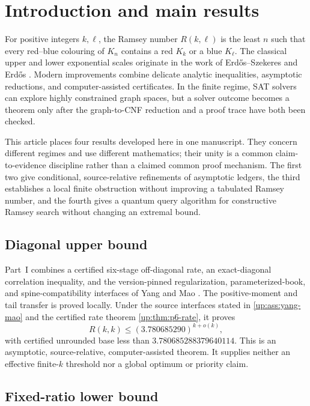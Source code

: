 \section{Introduction and main results}\label{sec:unified-introduction}

For positive integers $k,\ell$, the Ramsey number $R(k,\ell)$ is the
least $n$ such that every red--blue colouring of $K_n$ contains a red
$K_k$ or a blue $K_\ell$.  The classical upper and lower exponential
scales originate in the work of Erd\H{o}s--Szekeres and Erd\H{o}s
\cite{ErdosSzekeres1935,Erdos1947}.  Modern improvements combine delicate
analytic inequalities, asymptotic reductions, and computer-assisted
certificates.  In the finite regime, SAT solvers can explore highly
constrained graph spaces, but a solver outcome becomes a theorem only after
the graph-to-CNF reduction and a proof trace have both been checked.

This article places four results developed here in one manuscript.  They concern
different regimes and use different mathematics; their unity is a common
claim-to-evidence discipline rather than a claimed common proof mechanism.
The first two give conditional, source-relative refinements of asymptotic
ledgers, the third establishes a local finite obstruction without improving a
tabulated Ramsey number, and the fourth gives a quantum query algorithm for
constructive Ramsey search without changing an extremal bound.

\subsection{Diagonal upper bound}

Part~I combines a certified six-stage off-diagonal rate, an exact-diagonal
correlation inequality, and the version-pinned regularization,
parameterized-book, and spine-compatibility interfaces of Yang and Mao
\cite{YangMao2026}.  The positive-moment and tail transfer is proved locally.
Under the source interfaces stated in
\cref{up:ass:yang-mao} and the certified rate theorem
\cref{up:thm:p6-rate}, it proves
\[
 R(k,k)\le (3.780685290)^{k+o(k)},
\]
with certified unrounded base less than
$3.780685288379640114$.  This is an asymptotic, source-relative,
computer-assisted theorem.  It supplies neither an effective finite-$k$
threshold nor a global optimum or priority claim.

\subsection{Fixed-ratio lower bound}

